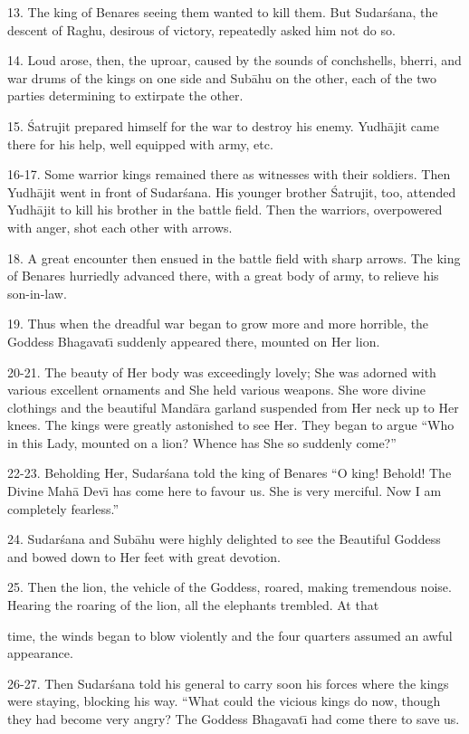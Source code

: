 13. The king of Benares seeing them wanted to kill them. But Sudar\'sana, the descent of Raghu, desirous of victory, repeatedly asked him not do so.

14. Loud arose, then, the uproar, caused by the sounds of conchshells, bherri, and war drums of the kings on one side and Sub\=ahu on the other, each of the two parties determining to extirpate the other.

15. \'Satrujit prepared himself for the war to destroy his enemy. Yudh\=ajit came there for his help, well equipped with army, etc.

16-17. Some warrior kings remained there as witnesses with their soldiers. Then Yudh\=ajit went in front of Sudar\'sana. His younger brother \'Satrujit, too, attended Yudh\=ajit to kill his brother in the battle field. Then the warriors, overpowered with anger, shot each other with arrows.

18. A great encounter then ensued in the battle field with sharp arrows. The king of Benares hurriedly advanced there, with a great body of army, to relieve his son-in-law.

19. Thus when the dreadful war began to grow more and more horrible, the Goddess Bhagavat\={\i} suddenly appeared there, mounted on Her lion.

20-21. The beauty of Her body was exceedingly lovely; She was adorned with various excellent ornaments and She held various weapons. She wore divine clothings and the beautiful Mand\=ara garland suspended from Her neck up to Her knees. The kings were greatly astonished to see Her. They began to argue ``Who in this Lady, mounted on a lion? Whence has She so suddenly come?''

22-23. Beholding Her, Sudar\'sana told the king of Benares ``O king! Behold! The Divine Mah\=a Dev\={\i} has come here to favour us. She is very merciful. Now I am completely fearless.''

24. Sudar\'sana and Sub\=ahu were highly delighted to see the Beautiful Goddess and bowed down to Her feet with great devotion.

25. Then the lion, the vehicle of the Goddess, roared, making tremendous noise. Hearing the roaring of the lion, all the elephants trembled. At that

time, the winds began to blow violently and the four quarters assumed an awful appearance.

26-27. Then Sudar\'sana told his general to carry soon his forces where the kings were staying, blocking his way. ``What could the vicious kings do now, though they had become very angry? The Goddess Bhagavat\={\i} had come there to save us.


